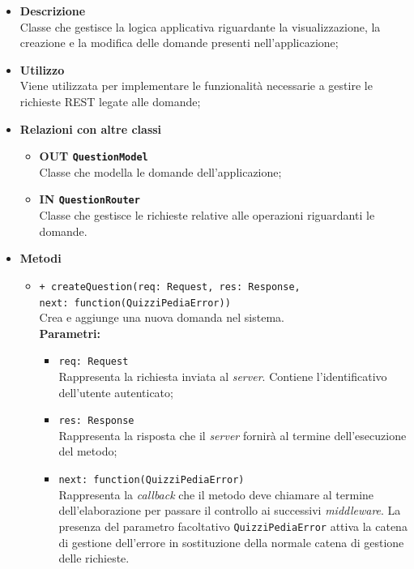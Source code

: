 	\begin{itemize}
		\item \textbf{Descrizione} \\
		Classe che gestisce la logica applicativa riguardante la visualizzazione, la creazione e la modifica delle domande presenti nell'applicazione;
		\item \textbf{Utilizzo} \\
		Viene utilizzata per implementare le funzionalità necessarie a gestire le richieste REST legate alle domande;
		\item \textbf{Relazioni con altre classi}
			\begin{itemize}
				\item \textbf{OUT \texttt{QuestionModel}} \\
				Classe che modella le domande dell'applicazione;
				\item \textbf{IN \texttt{QuestionRouter}} \\
				Classe che gestisce le richieste relative alle operazioni riguardanti le domande.
			\end{itemize}
		\item \textbf{Metodi}
			\begin{itemize}
				\item \texttt{+ createQuestion(req: Request, res: Response,\\ next: function(QuizziPediaError))} \\
				Crea e aggiunge una nuova domanda nel sistema. \\
				\textbf{Parametri:}
				\begin{itemize}
					\item \texttt{req: Request} \\
					Rappresenta la richiesta inviata al \textit{server}. Contiene l'identificativo dell'utente autenticato;
					\item \texttt{res: Response} \\
					Rappresenta la risposta che il \textit{server} fornirà al termine dell'esecuzione del metodo;
					\item \texttt{next: function(QuizziPediaError)} \\
					Rappresenta la \textit{callback} che il metodo deve chiamare al termine dell'elaborazione per passare il controllo ai successivi \textit{middleware}. La presenza del parametro facoltativo \texttt{QuizziPediaError} attiva la catena di gestione dell'errore in sostituzione della normale catena di gestione delle richieste.
				\end{itemize}

\end{itemize}
\end{itemize}
